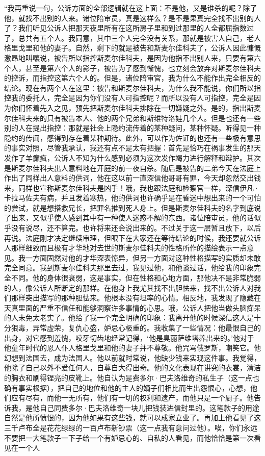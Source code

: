 \par “我再重说一句，公诉方面的全部逻辑就在这上面：不是他，又是谁杀的呢？除了他，就找不出别的人来。诸位陪审员，真是这样么？是不是果真完全找不出别的人了？我们听见公诉人把那天夜里所有在这所房子里和到过那里的人全都屈指数过了，总共有五个人。我同意，其中三个人完全没有关系，那就是被害人自己，老人格里戈里和他的妻子。自然，剩下的就是被告和斯麦尔佳科夫了，公诉人因此慷慨激昂地叫嚷说，被告所以指控斯麦尔佳科夫，是因为他指不出别人来，只要有第六个人，甚至是第六个人的影子，被告为了感到惭愧，也立刻会放弃对斯麦尔佳科夫的控诉，而指控这第六个人的。但是，诸位陪审官，我为什么不能作出完全相反的结论。现在有两个人在这里：被告和斯麦尔佳科夫，为什么我不能说，你们所以指控我的委托人，完全是因为你们没有人可指控呢？而所以没有人可指控，完全是因为你们怀着先入之见，预先把斯麦尔佳科夫排除在一切嫌疑之外。是的，指出斯麦尔佳科夫来的只有被告本人、他的两个兄弟和斯维特洛娃几个人。但是也还有一些别的人在提出指控：那就是社会上隐约流传着的某种疑问，某种怀疑。听得见一种隐约的传闻，感得到存在着某种期待。此外，可以作为佐证的也还有一些极有意思的事实对照，尽管我承认，我还有点不是太有把握：首先是恰巧在祸事发生的那天发作了羊癫疯，公诉人不知为什么感到必须为这次发作竭力进行解释和辩护。其次是斯麦尔佳科夫出人意料地在开庭的前一夜自杀。随后是被告的二弟今天在法庭上作出了同样出人意料的供词，他在这以前一直深信他哥哥有罪，今天却忽然交出钱来，同样也宣称斯麦尔佳科夫是凶手！哦，我也跟法庭和检察官一样，深信伊凡·卡拉马佐夫有病，并且发着寒热，他的供词也许确乎是在昏迷中想出来的一个可怕的尝试，就是想搭救兄长，把罪名推到死人身上。但是斯麦尔佳科夫的名字到底说了出来，又似乎使人感到其中有一种使人迷惑不解的东西。诸位陪审员，他的话似乎没有说尽，还不算完。也许将来还会说出来的。不过关于这一层暂且放下，以后再说。法庭刚才决定继续审理，但眼下在大家还在等待结论的时候，我还要就公诉人那样细致而且极有才华地对去世的斯麦尔佳科夫的性格所作的描绘表示一点意见。我一方面固然对他的才华深表惊异，但另一方面对这种性格描写的实质却未敢完全同意。我到斯麦尔佳科夫那里去过，我见过他，和他谈过话，他给我的印象完全不同。他的身体很衰弱，这是事实，但在性格和心地方面，那他决不是非常脆弱的人，像公诉人所断定的那样。在他身上我尤其找不出胆怯来，找不出公诉人对我们那样突出描写的那种胆怯来。他根本没有坦率的心情。相反地，我发现了隐藏在天真里面的严重不信任和能够洞察许多事情的心思。哦，公诉人把他当做头脑痴呆的人未免太老实了。他给了我一个完全明确的印象：我离开他的时候深信这人是十分狠毒，异常虚荣，复仇心盛，妒忌心极重的。我收集了一些情况：他最恨自己的出身，对它感到羞愧，咬牙切齿地经常记得，‘他是臭丽萨维塔养出来的。’他对于他童年时代的恩人仆人格里戈里和他的妻子并不尊敬。他咒骂俄罗斯，嘲笑它。他幻想到法国去，成为法国人。他以前就时常说，他缺少钱来实现这件事。我觉得，他除了自己以外不爱任何人，自尊自大得出奇。他的文化表现在讲究的衣裳，清洁的胸衣和刷得锃亮的皮靴上。他自认为是费多尔·巴夫洛维奇的私生子（这一点也确有事实根据），把自己的地位和他的主人的嫡子们相比而生出怨恨心，心想，他们应有尽有，而他一无所有，他们有一切的权利和遗产，而他只是一个厨子。他告诉我，是他自己同费多尔·巴夫洛维奇一块儿把钱装进信封里的。这笔款子的用途自然是他所愤恨的，因为他如果有这些钱，就可以成家立业了。再加上他看见了这三千卢布全是花花绿绿的一百卢布新钞票（这一点我有意问过他）。唉，你们永远不要把一大笔款子一下子给一个有妒忌心的、自私的人看见，而他恰恰是第一次看见在一个人